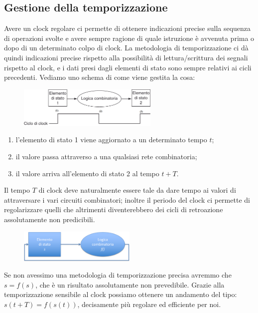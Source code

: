 \documentclass[class=book, crop=false, oneside]{standalone}
\begin{document}
\subsection{Gestione della temporizzazione}
Avere un clock regolare ci permette di ottenere indicazioni precise sulla sequenza di operazioni svolte e avere sempre ragione di quale istruzione è avvenuta prima o dopo di un determinato colpo di clock. La metodologia di temporizzazione ci dà quindi indicazioni precise rispetto alla possibilità di lettura/scrittura dei segnali rispetto al clock, e i dati presi dagli elementi di stato sono sempre relativi ai cicli precedenti. Vediamo uno schema di come viene gestita la cosa:
\begin{figure}[H]
	\centering
	\includegraphics[width=0.6\textwidth,keepaspectratio]{clock}
\end{figure}
\begin{enumerate}
	\item l'elemento di stato 1 viene aggiornato a un determinato tempo \(t\);
	\item il valore passa attraverso a una qualsiasi rete combinatoria;
	\item il valore arriva all'elemento di stato 2 al tempo \(t + T\).
\end{enumerate}
Il tempo \(T\) di clock deve naturalmente essere tale da dare tempo ai valori di attraversare i vari circuiti combinatori; inoltre il periodo del clock ci permette di regolarizzare quelli che altrimenti diventerebbero dei cicli di retroazione assolutamente non predicibili.
\begin{figure}[H]
	\centering
	\includegraphics[width=0.5\textwidth,keepaspectratio]{retroaz}
\end{figure}
Se non avessimo una metodologia di temporizzazione precisa avremmo che \(s = f(s)\), che è un risultato assolutamente non prevedibile. Grazie alla temporizzazione sensibile al clock possiamo ottenere un andamento del tipo: \(s(t + T) = f(s(t))\), decisamente più regolare ed efficiente per noi.
\end{document}
